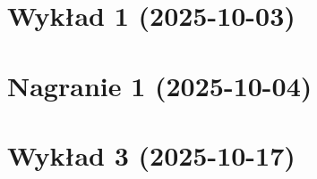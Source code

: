 \documentclass[12pt, a4paper, polish, openany]{book}
\begin{document}
\frontmatter



\tableofcontents


\titleformat{\chapter}[display]{\normalfont\Huge\bfseries}{}{0pt}{\Huge}
\titlespacing*{\chapter}{0pt}{0pt}{20pt}

\mainmatter

\chapter{Wykład 1 (2025-10-03)}


\chapter{Nagranie 1 (2025-10-04)}


\chapter{Wykład 3 (2025-10-17)}

\end{document}
